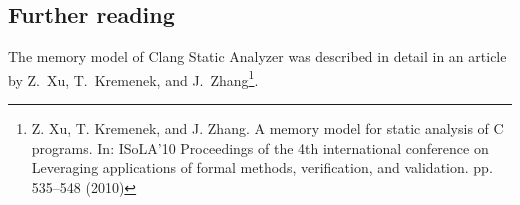 \documentclass[a4paper,12pt]{article}
\begin{document}
\subsection{Further reading}

The memory model of Clang Static Analyzer was described in detail in an article by Z.~Xu, T.~Kremenek, and J.~Zhang\footnote{Z. Xu, T. Kremenek, and J. Zhang. A memory model for static analysis of C programs. In: ISoLA'10 Proceedings of the 4th international conference on Leveraging applications of formal methods, verification, and validation. pp. 535--548 (2010)}.

\printindex[notion]
\printindex
\end{document}
